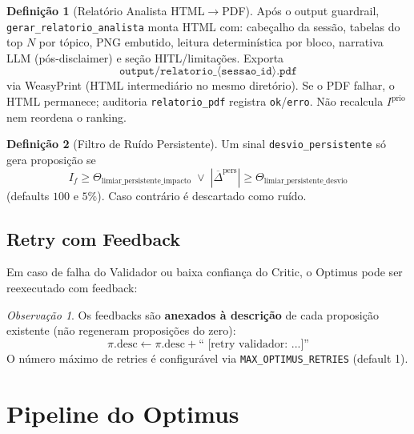 \documentclass[a4paper, 12pt]{report}
\theoremstyle{definition}
\newtheorem{definicao}{Defini\c{c}\~ao}[chapter]
\theoremstyle{remark}
\newtheorem{observacao}{Observa\c{c}\~ao}[chapter]
\newcommand{\abs}[1]{\left|#1\right|}
\begin{document}
\begin{definicao}[Relat\'orio Analista HTML$\to$PDF]
  Ap\'os o output guardrail, \texttt{gerar\_relatorio\_analista} monta
  HTML com: cabe\c{c}alho da sess\~ao, tabelas do top $N$ por t\'opico,
  PNG embutido, leitura determin\'istica por bloco, narrativa LLM
  (p\'os-disclaimer) e se\c{c}\~ao HITL/limita\c{c}\~oes. Exporta
  \[
    \texttt{output/relatorio\_}\langle\texttt{sessao\_id}\rangle\texttt{.pdf}
  \]
  via WeasyPrint (HTML intermedi\'ario no mesmo diret\'orio).
  Se o PDF falhar, o HTML permanece; auditoria \texttt{relatorio\_pdf}
  registra \texttt{ok}/\texttt{erro}. N\~ao recalcula $I^{\text{prio}}$
  nem reordena o ranking.
\end{definicao}

\begin{definicao}[Filtro de Ru\'ido Persistente]
  Um sinal \texttt{desvio\_persistente} s\'o gera proposi\c{c}\~ao se
  \[
    I_f \geq \Theta_{\text{limiar\_persistente\_impacto}}
    \;\lor\;
    \abs{\overline{\Delta}^{\text{pers}}} \geq
      \Theta_{\text{limiar\_persistente\_desvio}}
  \]
  (defaults $100$ e $5\%$). Caso contr\'ario \'e descartado como ru\'ido.
\end{definicao}



\subsection{Retry com Feedback}

Em caso de falha do Validador ou baixa confian\c{c}a do Critic,
o Optimus pode ser reexecutado com feedback:

\begin{observacao}
  Os feedbacks s\~ao \textbf{anexados \`a descri\c{c}\~ao} de cada
  proposi\c{c}\~ao existente (n\~ao regeneram proposi\c{c}\~oes do zero):
  \[
    \pi.\text{desc} \gets \pi.\text{desc} + \text{`` [retry validador: ...]''}
  \]
  O n\'umero m\'aximo de retries \'e configur\'avel via
  \texttt{MAX\_OPTIMUS\_RETRIES} (default 1).
\end{observacao}


\section{Pipeline do Optimus}
\end{document}
